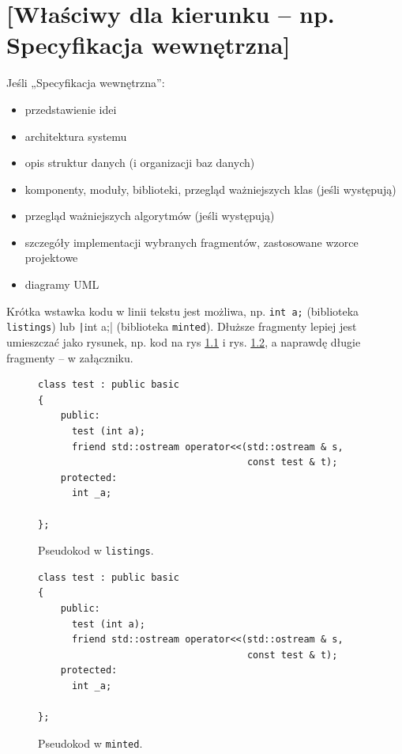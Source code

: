 \documentclass[a4paper,twoside,12pt]{book}
\begin{document}
\chapter{[Właściwy dla kierunku -- np. Specyfikacja wewnętrzna]}
Jeśli „Specyfikacja wewnętrzna”:
\begin{itemize}
\item przedstawienie idei
\item architektura systemu
\item opis struktur danych (i organizacji baz danych)
\item komponenty, moduły, biblioteki, przegląd ważniejszych klas (jeśli występują)
\item przegląd ważniejszych algorytmów (jeśli występują)
\item szczegóły implementacji wybranych fragmentów, zastosowane wzorce projektowe
\item diagramy UML
\end{itemize}



Krótka wstawka kodu w linii tekstu jest możliwa, np.  \lstinline|int a;| (biblioteka \texttt{listings}) lub  \texttt|int a;| (biblioteka \texttt{minted}). 
Dłuższe fragmenty lepiej jest umieszczać jako rysunek, np. kod na rys \ref{fig:pseudokod:listings} i rys. \ref{fig:pseudokod:minted}, a naprawdę długie fragmenty – w załączniku.
 


\begin{figure}
\centering
\begin{lstlisting}
class test : public basic
{
    public:
      test (int a);
      friend std::ostream operator<<(std::ostream & s, 
                                     const test & t);
    protected:
      int _a;  
      
};
\end{lstlisting}
\caption{Pseudokod w \texttt{listings}.}
\label{fig:pseudokod:listings}
\end{figure}

\begin{figure}
\centering
\begin{verbatim}
class test : public basic
{
    public:
      test (int a);
      friend std::ostream operator<<(std::ostream & s, 
                                     const test & t);
    protected:
      int _a;  
      
};
\end{verbatim}
\caption{Pseudokod w \texttt{minted}.}
\label{fig:pseudokod:minted}
\end{figure}
\end{document}
